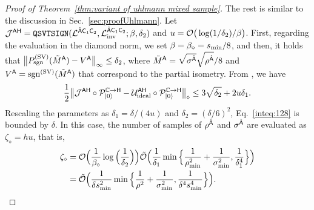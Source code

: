 \begin{proof}[Proof of Theorem~\ref{thm:variant of uhlmann mixed sample}]
The rest is similar to the discussion in Sec.~\ref{sec:proofUhlmann}.
Let ${\mathcal{J}}^{{\mathsf{A}}{\mathsf{H}}} = \mathtt{QSVTSIGN}({\mathcal{L}}^{\hat{{\mathsf{A}}}{\mathsf{C}}_1{\mathsf{C}}_2}, {\mathcal{L}}_{\rm inv}^{\hat{{\mathsf{A}}}{\mathsf{C}}_1{\mathsf{C}}_2}; \beta, \delta_2)$ and $u = {\mathcal{O}}\big(\log(1/\delta_2)/\beta\big)$.
First, regarding the evaluation in the diamond norm, we set $\beta = \beta_\diamond = s_{\rm min}/8$, and then, it holds that $\big\|P_{\mathrm{sgn}}^{(\rm SV)}(\tilde{M}^{\mathsf{A}}) - V^{\mathsf{A}}\big\|_\infty \leq \delta_2$, where $\tilde{M}^{\mathsf{A}} = \sqrt{\sigma^{\hat{{\mathsf{A}}}}}\sqrt{\rho^{\hat{{\mathsf{A}}}}}/8$ and $V^{\mathsf{A}} = \mathrm{sgn}^{(\rm SV)}(\tilde{M}^{\mathsf{A}})$ that correspond to the partial isometry.
From , we have
\begin{align}
\label{inteq:128}
    \frac{1}{2}\big\|{\mathcal{J}}^{{\mathsf{A}}{\mathsf{H}}}\circ{\mathcal{P}}_{|0\rangle}^{\mathbb{C}\rightarrow{\mathsf{H}}} - {\mathcal{U}}_{\rm ideal}^{{\mathsf{A}}{\mathsf{H}}} \circ {\mathcal{P}}_{|0\rangle}^{\mathbb{C}\rightarrow{\mathsf{H}}}\big\|_\diamond \leq 3\sqrt{\delta_2} + 2u\delta_1.
\end{align}
Rescaling the parameters as $\delta_1 = \delta/(4u)$ and $\delta_2 = (\delta/6)^2$, Eq.~\eqref{inteq:128} is bounded by $\delta$. In this case, the number of samples of $\rho^{\hat{{\mathsf{A}}}}$ and $\sigma^{\hat{{\mathsf{A}}}}$ are evaluated as $\zeta_\diamond = hu$, that is, 
\begin{align}
    \zeta_\diamond 
    &= {\mathcal{O}}\Big(\frac{1}{\beta_\diamond}\log{\Big(\frac{1}{\delta_2}\Big)}\Big)\tilde{{\mathcal{O}}}\Big(\frac{1}{\delta_1}\min\Big\{\frac{1}{\rho_{\rm min}^2} + \frac{1}{\sigma_{\rm min}^2}, \frac{1}{\delta_1^4}\Big\}\Big) \\
    &= \tilde{{\mathcal{O}}}\Big(\frac{1}{\delta s_{\rm min}^2}\min\Big\{\frac{1}{\rho^2}+\frac{1}{\sigma_{\rm min}^2}, \frac{1}{\delta^4s_{\rm min}^4}\Big\}\Big).
\end{align}




\end{proof}

